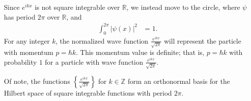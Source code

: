 \documentclass[10pt]{extarticle}
\newcommand{\Z}{\mathbb{Z}}
\newcommand{\R}{\mathbb{R}}
\newcommand{\set}[1]{\left\{#1\right\}}
\theoremstyle{plain}
\theoremstyle{definition}
\theoremstyle{remark}
\renewcommand{\newline}{\hfill\break}
\begin{document}
  Since $e^{ikx}$ is not square integrable over $\R$, we instead move to the circle, where $\psi$ has period $2\pi$ over $\R$, and
  \begin{align*}
    \int_{0}^{2\pi}\left\vert \psi(x) \right\vert^2 &= 1.
  \end{align*}
  For any integer $k$, the normalized wave function $\frac{e^{ikx}}{\sqrt{2\pi}}$ will represent the particle with momentum $p = \hbar k$. This momentum value is definite; that is, $p = \hbar k$ with probability $1$ for a particle with wave function $\frac{e^{ikx}}{\sqrt{2\pi}}$.\newline

  Of note, the functions $\set{\frac{e^{ikx}}{\sqrt{2\pi}}}$ for $k\in \Z$ form an orthonormal basis for the Hilbert space of square integrable functions with period $2\pi$.\newline
\end{document}
